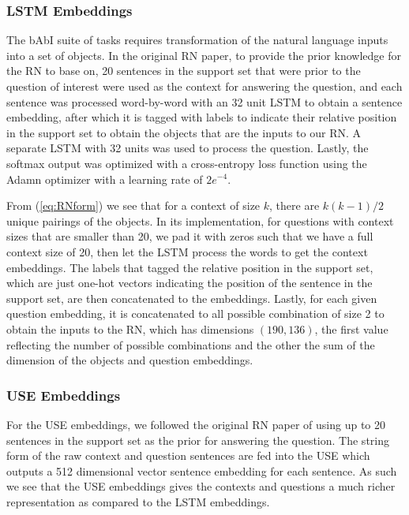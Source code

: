 \documentclass{article}
\begin{document}
\subsubsection{LSTM Embeddings}

The bAbI suite of tasks requires transformation of the natural language inputs into a set of objects. In the original RN paper, to provide the prior knowledge for the RN to base on, 20 sentences in the support set that were prior to the question of interest were used as the context for answering the question, and each sentence was processed word-by-word with an 32 unit LSTM to obtain a sentence embedding, after which it is tagged with labels to indicate their relative position in the support set to obtain the objects that are the inputs to our RN. A separate LSTM with 32 units was used to process the question. Lastly, the softmax output was optimized with a cross-entropy loss function using the Adamn optimizer with a learning rate of $2e^{-4}$.

From (\ref{eq:RNform}) we see that for a context of size $k$, there are $k(k-1)/2$ unique pairings of the objects. In its implementation, for questions with context sizes that are smaller than 20, we pad it with zeros such that we have a full context size of 20, then let the LSTM process the words to get the context embeddings. The labels that tagged the relative position in the support set, which are just one-hot vectors indicating the position of the sentence in the support set, are then concatenated to the embeddings. Lastly, for each given question embedding, it is concatenated to all possible combination of size 2 to obtain the inputs to the RN, which has dimensions $(190, 136)$, the first value reflecting the number of possible combinations and the other the sum of the dimension of the objects and question embeddings.




\subsubsection{USE Embeddings}

For the USE embeddings, we followed the original RN paper of using up to 20 sentences in the support set as the prior for answering the question. The string form of the raw context and question sentences are fed into the USE which outputs a 512 dimensional vector sentence embedding for each sentence. As such we see that the USE embeddings gives the contexts and questions a much richer representation as compared to the LSTM embeddings.
\end{document}
